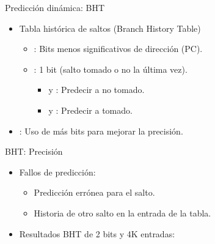\begin{frame}[t]{Predicción dinámica: BHT}
\begin{itemize}
  \item Tabla histórica de saltos (Branch History Table)
    \begin{itemize}
      \item {}: Bits menos significativos de dirección (PC).
      \item {}: 1 bit (salto tomado o no la última vez).
        \begin{itemize}
          \item {} y : Predecir a no tomado.
          \item {} y : Predecir a tomado.
        \end{itemize}
    \end{itemize}
\end{itemize}
\makebox[\textwidth][c]{

}
\begin{itemize}
  \item {}: Uso de más bits para mejorar la precisión.
\end{itemize}
\end{frame}

\begin{frame}[t,shrink=10]{BHT: Precisión}
\begin{itemize}
  \item Fallos de predicción:
    \begin{itemize}
      \item Predicción errónea para el salto.
      \item Historia de otro salto en la entrada de la tabla.
    \end{itemize}
\item Resultados BHT de 2 bits y 4K entradas:
\end{itemize}
\end{frame}

